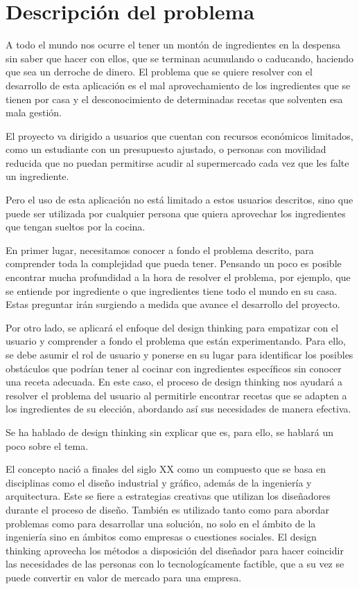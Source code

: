 \section{Descripción del problema}
A todo el mundo nos ocurre el tener un montón de ingredientes en la despensa sin saber que hacer con ellos, que se terminan acumulando o caducando, haciendo que sea un derroche de dinero. El problema que se quiere resolver con el desarrollo de esta aplicación es el mal aprovechamiento de los ingredientes que se tienen por casa y el desconocimiento de determinadas recetas que solventen esa mala gestión.

El proyecto va dirigido a usuarios que cuentan con recursos económicos limitados, como un estudiante con un presupuesto ajustado, o personas con movilidad reducida que no puedan permitirse acudir al supermercado cada vez que les falte un ingrediente. 

Pero el uso de esta aplicación no está limitado a estos usuarios descritos, sino que puede ser utilizada por cualquier persona que quiera aprovechar los ingredientes que tengan sueltos por la cocina.

En primer lugar, necesitamos conocer a fondo el problema descrito, para comprender toda la complejidad que pueda tener. Pensando un poco es posible encontrar mucha profundidad a la hora de resolver el problema, por ejemplo, que se entiende por ingrediente o que ingredientes tiene todo el mundo en su casa. Estas preguntar irán surgiendo a medida que avance el desarrollo del proyecto.

Por otro lado, se aplicará el enfoque del \gls{design thinking} para empatizar con el usuario y comprender a fondo el problema que están experimentando. Para ello, se debe asumir el rol de usuario y ponerse en su lugar para identificar los posibles obstáculos que podrían tener al cocinar con ingredientes específicos sin conocer una receta adecuada. En este caso, el proceso de \gls{design thinking} nos ayudará a resolver el problema del usuario al permitirle encontrar recetas que se adapten a los ingredientes de su elección, abordando así sus necesidades de manera efectiva.

Se ha hablado de \gls{design thinking} sin explicar que es, para ello, se hablará un poco sobre el tema. 

El concepto nació a finales del siglo XX como un compuesto que se basa en disciplinas como el diseño industrial y gráfico, además de la ingeniería y arquitectura. Este se fiere a estrategias creativas que utilizan los diseñadores durante el proceso de diseño. También es utilizado tanto como para abordar problemas como para desarrollar una solución, no solo en el ámbito de la ingeniería sino en ámbitos como empresas o cuestiones sociales. El \gls{design thinking} aprovecha los métodos a disposición del diseñador para hacer coincidir las necesidades de las personas con lo tecnologícamente factible, que a su vez se puede convertir en valor de mercado para una empresa.

